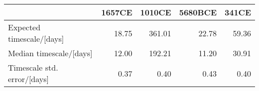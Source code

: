 \begin{tabular}{lrrrr}
\toprule
{} &  1657CE &  1010CE &  5680BCE &  341CE \\
\midrule
Expected timescale/[days]   &   18.75 &  361.01 &    22.78 &  59.36 \\
Median timescale/[days]     &   12.00 &  192.21 &    11.20 &  30.91 \\
Timescale std. error/[days] &    0.37 &    0.40 &     0.43 &   0.40 \\
\bottomrule
\end{tabular}
